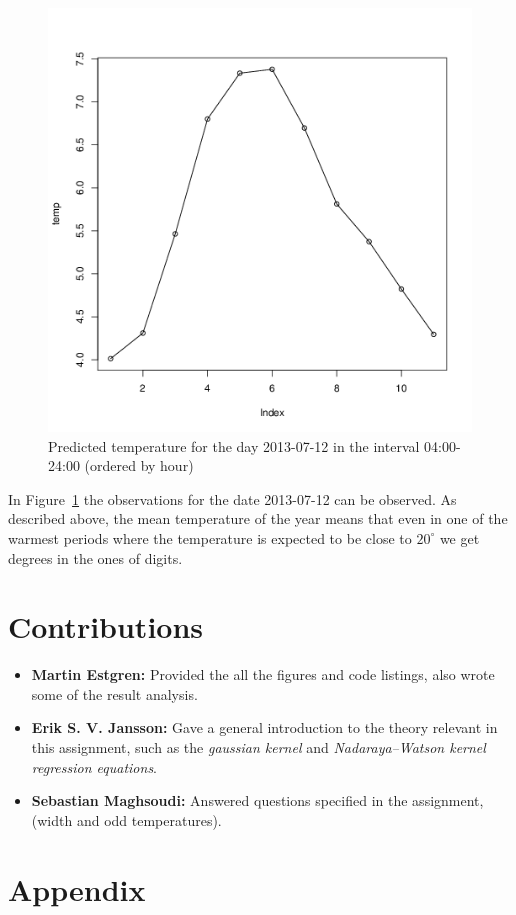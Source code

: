 \documentclass[a4paper, twocolumn]{article}
\begin{document}
    \begin{figure}[H]
    \centering
    \caption{Predicted temperature for the day 2013-07-12 in the interval 04:00-24:00 (ordered by hour)\label{fig:bad_result}}
	    \begin{minipage}[]{0.4\textwidth}
	    	\includegraphics[width=\textwidth]{share/bad_result.png}
	    \end{minipage}
    \end{figure}
	In Figure~\ref{fig:bad_result} the observations for the date 2013-07-12 can be observed. As described above, the mean temperature of the year means that even in one of the warmest periods where the temperature is expected to be close to \(20^\circ \) we get degrees in the ones of digits.

    \section*{Contributions}

    \begin{itemize}
    	\item{\textbf{Martin Estgren:} Provided the all the figures and code listings, also wrote some of the result analysis.}
        \item{\textbf{Erik S. V. Jansson:} Gave a general introduction to the theory relevant in this assignment, such as the \emph{gaussian kernel} and \emph{Nadaraya–Watson kernel regression equations}.}
    	\item{\textbf{Sebastian Maghsoudi:} Answered questions specified in the assignment,(width and odd temperatures).}
    \end{itemize}

    \nocite{*} %
    
    
    \onecolumn \appendix
    \section*{Appendix}
 	


    
\end{document}
